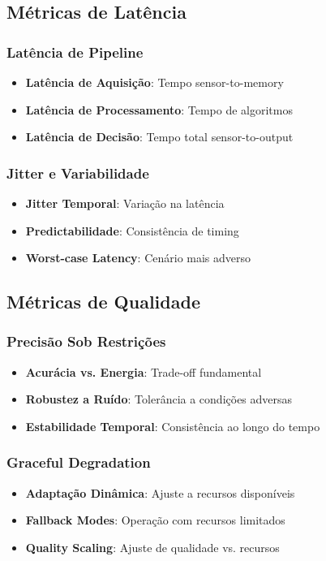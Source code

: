 \subsection{Métricas de Latência}

\subsubsection{Latência de Pipeline}
\begin{itemize}
    \item \textbf{Latência de Aquisição}: Tempo sensor-to-memory
    \item \textbf{Latência de Processamento}: Tempo de algoritmos
    \item \textbf{Latência de Decisão}: Tempo total sensor-to-output
\end{itemize}

\subsubsection{Jitter e Variabilidade}
\begin{itemize}
    \item \textbf{Jitter Temporal}: Variação na latência
    \item \textbf{Predictabilidade}: Consistência de timing
    \item \textbf{Worst-case Latency}: Cenário mais adverso
\end{itemize}

\subsection{Métricas de Qualidade}

\subsubsection{Precisão Sob Restrições}
\begin{itemize}
    \item \textbf{Acurácia vs. Energia}: Trade-off fundamental
    \item \textbf{Robustez a Ruído}: Tolerância a condições adversas
    \item \textbf{Estabilidade Temporal}: Consistência ao longo do tempo
\end{itemize}

\subsubsection{Graceful Degradation}
\begin{itemize}
    \item \textbf{Adaptação Dinâmica}: Ajuste a recursos disponíveis
    \item \textbf{Fallback Modes}: Operação com recursos limitados
    \item \textbf{Quality Scaling}: Ajuste de qualidade vs. recursos
\end{itemize}

